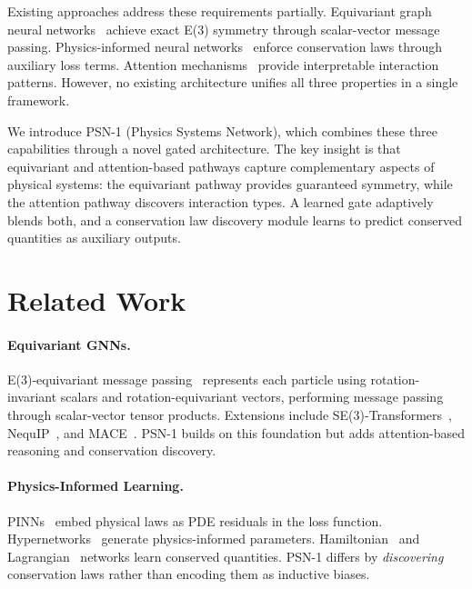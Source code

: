 \documentclass[10pt,twocolumn]{article}
\begin{document}
Existing approaches address these requirements partially. Equivariant graph neural networks~\cite{satorras2021egnn, brandstetter2022message} achieve exact E(3) symmetry through scalar-vector message passing. Physics-informed neural networks~\cite{raissi2019physics, cranmer2020discovering} enforce conservation laws through auxiliary loss terms. Attention mechanisms~\cite{velickovic2018graph, iiit-hyderabad2022graph} provide interpretable interaction patterns. However, no existing architecture unifies all three properties in a single framework.

We introduce PSN-1 (Physics Systems Network), which combines these three capabilities through a novel gated architecture. The key insight is that equivariant and attention-based pathways capture complementary aspects of physical systems: the equivariant pathway provides guaranteed symmetry, while the attention pathway discovers interaction types. A learned gate adaptively blends both, and a conservation law discovery module learns to predict conserved quantities as auxiliary outputs.

\section{Related Work}
\label{sec:related}

\paragraph{Equivariant GNNs.}
E(3)-equivariant message passing~\cite{satorras2021egnn} represents each particle using rotation-invariant scalars and rotation-equivariant vectors, performing message passing through scalar-vector tensor products. Extensions include SE(3)-Transformers~\cite{fuchs2020se3}, NequIP~\cite{batzner2022nequip}, and MACE~\cite{batatia2022mace}. PSN-1 builds on this foundation but adds attention-based reasoning and conservation discovery.

\paragraph{Physics-Informed Learning.}
PINNs~\cite{raissi2019physics} embed physical laws as PDE residuals in the loss function. Hypernetworks~\cite{liu2020surrogate} generate physics-informed parameters. Hamiltonian~\cite{greydanus2019hamiltonian} and Lagrangian~\cite{cranmer2020lagrangian} networks learn conserved quantities. PSN-1 differs by \emph{discovering} conservation laws rather than encoding them as inductive biases.
\end{document}
